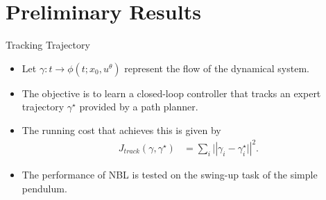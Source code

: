 \section{Preliminary Results}

\begin{frame}{Tracking Trajectory}
\begin{itemize}
    \item Let $\gamma : t \rightarrow \phi(t;x_0, u^\theta)$ represent the flow of the dynamical system.
    \item The objective is to learn a closed-loop controller that tracks an expert trajectory $\gamma^\star$ provided by a path planner.
    \item The running cost that achieves this is given by 
    \begin{align*}
        J_{track}(\gamma, \gamma^\star) &= \sum_{i} |\left| \gamma_{i} - \gamma^\star_{i} | \right |^2.
    \end{align*}
    \item The performance of NBL is tested on the swing-up task of the simple pendulum.
\end{itemize}
\end{frame}

